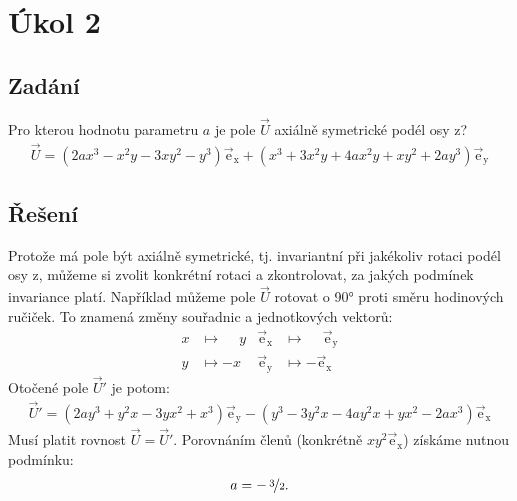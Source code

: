 \documentclass[10pt,a4paper]{article}
\def\ph{\phantom}
\newcommand{\const}[1]{\text{#1}}
\begin{document}
\section*{Úkol 2}

\subsection*{Zadání}
Pro kterou hodnotu parametru $a$ je pole $\vec{U}$ axiálně symetrické podél osy $\const{z}$?
\begin{gather*}
    \vec{U}
    = \left( 2ax^3 - x^2y - 3xy^2 - y^3 \right) \vec{\const{e}}_\const{x}
    + \left( x^3 + 3x^2 y + 4ax^2 y + xy^2 + 2ay^3 \right) \vec{\const{e}}_\const{y}
\end{gather*}

\subsection*{Řešení}
Protože má pole být axiálně symetrické, tj. invariantní při jakékoliv rotaci podél osy $\const{z}$, můžeme si zvolit konkrétní rotaci a zkontrolovat, za jakých podmínek invariance platí. Například můžeme pole $\vec{U}$ rotovat o 90° proti směru hodinových ručiček. To znamená změny souřadnic a jednotkových vektorů:
\begin{align*}
    x &\mapsto \ph{-} y &
    \vec{\const{e}}_\const{x} &\mapsto \ph{-} \vec{\const{e}}_\const{y} \\
    y &\mapsto -x &
    \vec{\const{e}}_\const{y} &\mapsto -\vec{\const{e}}_\const{x}
\end{align*}
Otočené pole $\vec{U}'$ je potom:
\begin{gather*}
    \vec{U}'
    = \left( 2ay^3 + y^2x - 3yx^2 + x^3 \right) \vec{\const{e}}_\const{y}
    - \left( y^3 - 3y^2 x - 4ay^2 x + yx^2 - 2ax^3 \right) \vec{\const{e}}_\const{x}
\end{gather*}
Musí platit rovnost $\vec{U} = \vec{U}'$. Porovnáním členů (konkrétně $xy^2\vec{\const{e}}_\const{x}$) získáme nutnou podmínku:
\begin{align*}
    a = - \, \nicefrac{3}{2}.
\end{align*}
\end{document}
